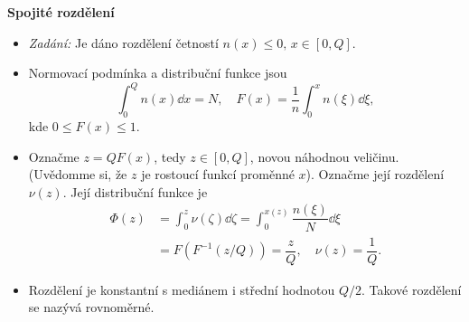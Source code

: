 \begin{mdframed}[style=mdexam]
\begin{example}
    \textbf{Spojité rozdělení}
      \begin{itemize}
        \item \emph{Zadání:} Je dáno rozdělení četností \(n(x) \leq 0,\, x \in [0, Q]\).
        \item Normovací podmínka a distribuční funkce jsou
              \begin{equation*}
                \int_{0}^{Q}n(x)\dd{x} = N, \quad 
                F(x) = \dfrac{1}{n}\int_{0}^{x}n(\xi)\dd{\xi},                
              \end{equation*}
              kde \(0 \leq F(x) \leq 1.\)
        \item Označme \(z = QF(x)\), tedy \(z \in [0, Q]\), novou náhodnou veličinu. (Uvědomme si,
              že \(z\) je rostoucí funkcí proměnné \(x\)). Označme její rozdělení \(\nu(z)\). Její
              distribuční funkce je
              \begin{align*}
                \Phi(z) &= \int_{0}^{z}\nu(\zeta)\dd{\zeta} 
                         = \int_{0}^{x(z)}\dfrac{n(\xi)}{N}\dd{\xi}          \\
                        &= F\left(F^{-1}(z/Q)\right) 
                        = \dfrac{z}{Q}, \quad
                \nu(z) = \dfrac{1}{Q}.
              \end{align*}
        \item Rozdělení je konstantní s mediánem i střední hodnotou \(Q/2\). Takové rozdělení se
              nazývá rovnoměrné.
      \end{itemize}
  \end{example}
\end{mdframed}